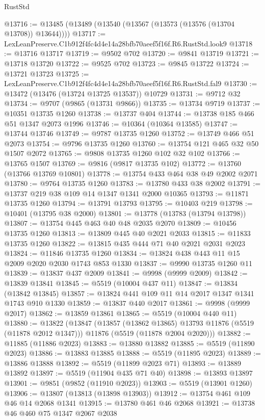 \begin{lexlean}{RustStd}
\begin{coremodule}
@13716 := @13485 (@13489 (@13540 (@13567 (@13573 (@13576 (@13704 @13708)) @13644))))
@13717 := LexLeanPreserve.C1b912f4fc4d4e14a28bfb70aeef5f16f.R6.RustStd.look9
@13718 := @13716 @13717
@13719 := @9502 @702
@13720 := @9841 @13719
@13721 := @13718 @13720
@13722 := @9525 @702
@13723 := @9845 @13722
@13724 := @13721 @13723
@13725 := LexLeanPreserve.C1b912f4fc4d4e14a28bfb70aeef5f16f.R6.RustStd.fal9
@13730 := @13472 (@13476 (@13724 @13725 @13537)) @10729
@13731 := @9712 @32
@13734 := @9707 (@9865 (@13731 @9866))
@13735 := @13734 @9719
@13737 := @10351 @13735 @1260
@13738 := @13737 @404
@13744 := @13738 @185 @466 @51 @1347 @2073 @1996
@13746 := @10364 (@10364 @13585)
@13747 := @13744 @13746
@13749 := @9787 @13735 @1260
@13752 := @13749 @466 @51 @2073
@13754 := @9796 @13735 @1260
@13760 := @13754 @121 @465 @32 @50 @1507 @2072
@13765 := @9808 @13735 @1260 @102 @32 @102
@13766 := @13765 @1507
@13769 := @9816 (@9817 @13735 @102)
@13772 := @13760 (@13766 @13769 @10801)
@13778 := @13754 @433 @464 @38 @49 @2002 @2071
@13780 := @9764 @13735 @1260
@13783 := @13780 @433 @38 @2002
@13791 := @13737 @219 @38 @109 @14 @1347 @1341 @2000 @10365
@13793 := @11871 @13735 @1260
@13794 := @13791 @13793
@13795 := @10403 @219
@13798 := @10401 (@13795 @38 @2000)
@13801 := @13778 (@13783 (@13794 @13798))
@13807 := @13754 @445 @463 @40 @48 @2035 @2070
@13809 := @10456 @13735 @1260
@13813 := @13809 @445 @40 @2021 @2033
@13815 := @11833 @13735 @1260
@13822 := @13815 @435 @444 @71 @40 @2021 @2031 @2023
@13824 := @11846 @13735 @1260
@13834 := @13824 @438 @443 @11 @15 @2009 @2020 @2030 @1743 @853 @1330
@13837 := @9990 @13735 @1260 @11
@13839 := @13837 @437 @2009
@13841 := @9998 (@9999 @2009)
@13842 := @13839 @13841
@13845 := @5519 (@10004 @437 @11)
@13847 := @13834 (@13842 @13845)
@13857 := @13824 @441 @109 @11 @14 @2017 @1347 @1341 @1743 @910 @1330
@13859 := @13837 @440 @2017
@13861 := @9998 (@9999 @2017)
@13862 := @13859 @13861
@13865 := @5519 (@10004 @440 @11)
@13880 := @13822
    (@13847
      (@13857 (@13862 @13865) @13793 @11876 (@5519 (@11878 @2012 @1347)))
      @11876
      (@5519 (@11878 @2004 @2020)))
@13882 := @11885 (@11886 @2023)
@13883 := @13880 @13882
@13885 := @5519 (@11890 @2023)
@13886 := @13883 @13885
@13888 := @5519 (@11895 @2023)
@13889 := @13886 @13888
@13892 := @5519 (@11899 @2023 @71)
@13893 := @13889 @13892
@13897 := @5519 (@11904 @435 @71 @40)
@13898 := @13893 @13897
@13901 := @9851 (@9852 (@11910 @2023))
@13903 := @5519 (@13901 @1260)
@13906 := @13807 (@13813 (@13898 @13903))
@13912 := @13754 @461 @109 @46 @14 @2068 @1341
@13915 := @13780 @461 @46 @2068
@13921 := @13738 @46 @460 @75 @1347 @2067 @2038

\end{coremodule}
\end{lexlean}
